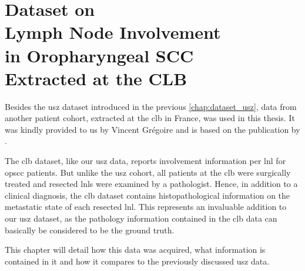 \documentclass[\relativeRoot/main.tex]{subfiles}
\begin{document}
\chapter[
    CLB Dataset on Lymph Node Involvement in OPSCC
]{
    Dataset on\\Lymph Node Involvement\\in Oropharyngeal SCC\\Extracted at the CLB
}
\label{chap:dataset_clb}

Besides the \gls{usz} dataset introduced in the previous \cref{chap:dataset_usz}, data from another patient cohort, extracted at the \gls{clb} in France, was used in this thesis. It was kindly provided to us by Vincent Grégoire and is based on the publication by .

The \gls{clb} dataset, like our \gls{usz} data, reports involvement information per \gls{lnl} for \gls{opscc} patients. But unlike the \gls{usz} cohort, all patients at the \gls{clb} were surgically treated and resected \glspl{lnl} were examined by a pathologist. Hence, in addition to a clinical diagnosis, the \gls{clb} dataset contains histopathological information on the metastatic state of each resected \gls{lnl}. This represents an invaluable addition to our \gls{usz} dataset, as the pathology information contained in the \gls{clb} data can basically be considered to be the ground truth.

This chapter will detail how this data was acquired, what information is contained in it and how it compares to the previously discussed \gls{usz} data.







\end{document}
